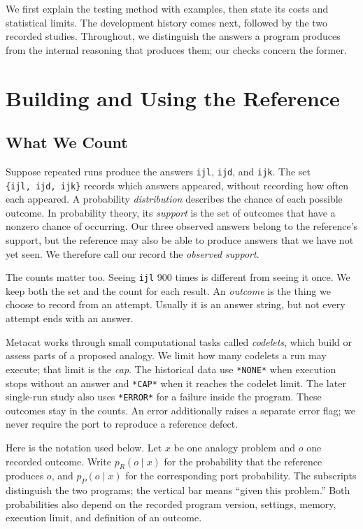\documentclass[10pt,letterpaper]{article}
\begin{document}
We first explain the testing method with examples, then state its costs and statistical
limits. The development history comes next, followed by the two recorded studies.
Throughout, we distinguish the answers a program produces from the internal reasoning that
produces them; our checks concern the former.

\section{Building and Using the Reference}\label{sec:method}

\subsection{What We Count}\label{sec:outcomes}

Suppose repeated runs produce the answers \texttt{ijl}, \texttt{ijd}, and \texttt{ijk}.
The set \texttt{\{ijl,\ ijd,\ ijk\}} records which answers appeared, without recording how
often each appeared. A probability \emph{distribution} describes the chance of each
possible outcome. In probability theory, its \emph{support} is the set of outcomes that
have a nonzero chance of occurring. Our three observed answers belong to the reference's
support, but the reference may also be able to produce answers that we have not yet seen.
We therefore call our record the \emph{observed support}.

The counts matter too. Seeing \texttt{ijl} 900 times is different from seeing it once. We
keep both the set and the count for each result. An \emph{outcome} is the thing we choose
to record from an attempt. Usually it is an answer string, but not every attempt ends with
an answer.

Metacat works through small computational tasks called \emph{codelets}, which build or
assess parts of a proposed analogy. We limit how many codelets a run may execute; that
limit is the \emph{cap}. The historical data use \texttt{*NONE*} when execution stops
without an answer and \texttt{*CAP*} when it reaches the codelet limit. The later
single-run study also uses \texttt{*ERROR*} for a failure inside the program. These
outcomes stay in the counts. An error additionally raises a separate error flag; we never
require the port to reproduce a reference defect.

Here is the notation used below. Let \(x\) be one analogy problem and \(o\) one recorded
outcome. Write \(p_R(o\mid x)\) for the probability that the reference produces \(o\), and
\(p_P(o\mid x)\) for the corresponding port probability. The subscripts distinguish the
two programs; the vertical bar means ``given this problem.'' Both probabilities also
depend on the recorded program version, settings, memory, execution limit, and definition
of an outcome.
\end{document}
